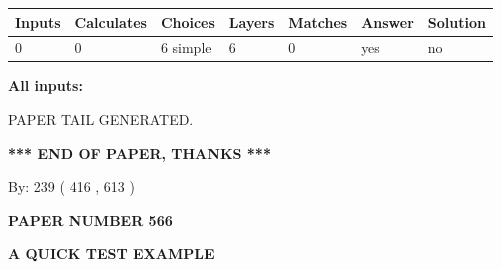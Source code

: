 \documentclass[12pt]{article}
\begin{document}
 
\noindent{}
 
 
   
   
   
   
\noindent\begin{tabular}{|l|l|l|l|l|l|l|}
 \hline
Inputs & Calculates & Choices & Layers & Matches & Answer & Solution \\ \hline
 0  & 
 0  & 
 6
  simple  
  & 
 6  & 
 0  & 
  yes & 
  no 
  \\ \hline
 \end{tabular}
   
   
   
   
\noindent{}
   
   
   
   
\noindent\vspace{0.1in}\hspace{-0.08in} {\textbf{\Large{All inputs: }}}
   
   
   
   
   
   
 \vspace{0.2in}
 
   
   
\vspace{2.0in} PAPER TAIL GENERATED.
   
   
   
   
\vspace{1.0in} 
{\textbf{\large{ *** END OF PAPER, THANKS *** }}} 
   
   
\hspace{1.0in} By: 
 239 ( 416 ,  613 )
   
   
   
   
\newpage 
\setcounter{page}{ 
   566001 } 
   
   
   
   
 {\textbf{ \Large{ PAPER NUMBER  566  }}}
   
   
\vspace{0.2in}
   
   
   
   
   
   
   
   
 \vspace{0.2in}
{\LARGE {\textbf{ A QUICK TEST EXAMPLE}}}
   
\end{document}
